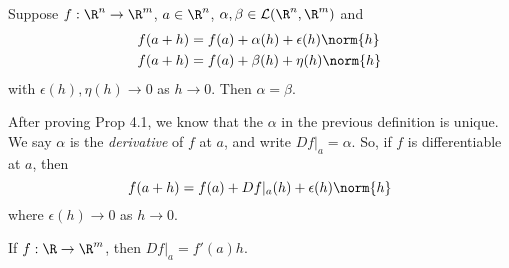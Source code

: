 \begin{proposition}                       %
Suppose $f:\R^n\to \R^m$, $a \in \R^n$, $\alpha,\beta \in \mathcal{L}(\R^n,\R^m)$ and 
\begin{align*}
    f(a+h) &= f(a) + \alpha(h) + \epsilon(h) \norm{h} \\
    f(a+h) &= f(a) + \beta(h) + \eta(h) \norm{h}
\end{align*}
with $\epsilon(h), \eta(h)\to 0$ as $h\to 0$. Then $\alpha = \beta$.
\end{proposition}

\begin{definition}
After proving Prop 4.1, we know that the $\alpha$ in the previous definition is unique. We say $\alpha$ is the \emph{derivative} of $f$ at $a$, and write $Df|_a = \alpha$. So, if $f$ is differentiable at $a$, then \[ f(a+h) = f(a) + Df|_a(h) + \epsilon(h) \norm{h}\]
where $\epsilon(h)\to 0$ as $h\to 0$.
\end{definition}
\begin{remark}
If $f:\R\to \R^m$, then $Df|_a = f'(a)h.$
\end{remark}    